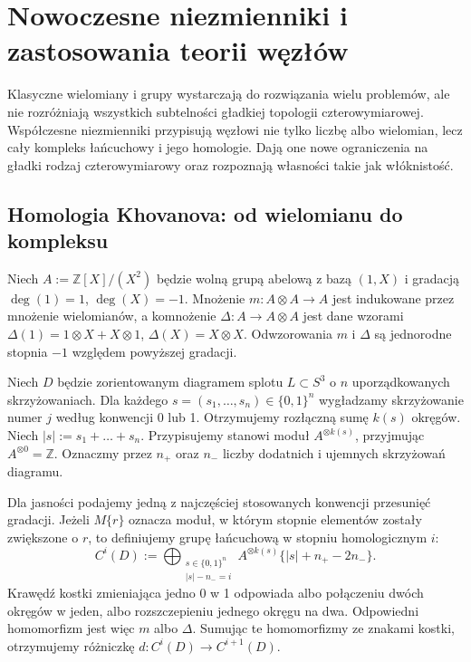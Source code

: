 \chapter{Nowoczesne niezmienniki i zastosowania teorii węzłów}
\label{ch:kt-nowoczesne}

Klasyczne wielomiany i grupy wystarczają do rozwiązania wielu
problemów, ale nie rozróżniają wszystkich subtelności gładkiej
topologii czterowymiarowej. Współczesne niezmienniki przypisują
węzłowi nie tylko liczbę albo wielomian, lecz cały kompleks
łańcuchowy i jego homologie. Dają one nowe ograniczenia
na gładki rodzaj czterowymiarowy oraz rozpoznają własności
takie jak włóknistość.

\section{Homologia Khovanova: od wielomianu do kompleksu}
\label{sec:kt-khovanov}

\begin{definicja}
Niech $A:=\mathbb Z[X]/(X^2)$ będzie wolną grupą abelową
z bazą $(1,X)$ i gradacją $\deg(1)=1$, $\deg(X)=-1$.
Mnożenie $m\colon A\otimes A\to A$ jest indukowane przez
mnożenie wielomianów, a komnożenie
$\Delta\colon A\to A\otimes A$ jest dane wzorami
$\Delta(1)=1\otimes X+X\otimes1$,
$\Delta(X)=X\otimes X$. Odwzorowania $m$ i $\Delta$
są jednorodne stopnia $-1$ względem powyższej gradacji.
\end{definicja}

\begin{definicja}
Niech $D$ będzie zorientowanym diagramem splotu
$L\subset S^3$ o $n$ uporządkowanych skrzyżowaniach.
Dla każdego $s=(s_1,\dots,s_n)\in\{0,1\}^n$
wygładzamy skrzyżowanie numer $j$ według konwencji
0 lub 1. Otrzymujemy rozłączną sumę $k(s)$ okręgów.
Niech $|s|:=s_1+\dots+s_n$.
Przypisujemy stanowi moduł $A^{\otimes k(s)}$, przyjmując
$A^{\otimes0}=\mathbb Z$. Oznaczmy przez $n_+$ oraz $n_-$
liczby dodatnich i ujemnych skrzyżowań diagramu.
\end{definicja}

Dla jasności podajemy jedną z najczęściej stosowanych
konwencji przesunięć gradacji. Jeżeli $M\{r\}$ oznacza
moduł, w którym stopnie elementów zostały zwiększone o $r$,
to definiujemy grupę łańcuchową w stopniu homologicznym $i$:
\[
C^{i}(D):=
\bigoplus_{\substack{s\in\{0,1\}^n\\|s|-n_-=i}}
A^{\otimes k(s)}\{|s|+n_+-2n_-\}.
\]
Krawędź kostki zmieniająca jedno 0 w 1 odpowiada
albo połączeniu dwóch okręgów w jeden, albo rozszczepieniu
jednego okręgu na dwa. Odpowiedni homomorfizm jest więc
$m$ albo $\Delta$. Sumując te homomorfizmy ze znakami
kostki, otrzymujemy różniczkę $d\colon C^i(D)\to C^{i+1}(D)$.

